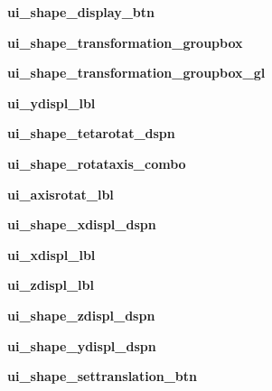 \begin{DoxyCompactItemize}
\item 
\hypertarget{a00099_ae8028f5880df8b13414eba6f474a3aee}{}\label{a00099_ae8028f5880df8b13414eba6f474a3aee} 
{\bfseries ui\+\_\+shape\+\_\+display\+\_\+btn}
\item 
\hypertarget{a00099_a1fc23acd26cd3067a21b1814e61be00e}{}\label{a00099_a1fc23acd26cd3067a21b1814e61be00e} 
{\bfseries ui\+\_\+shape\+\_\+transformation\+\_\+groupbox}
\item 
\hypertarget{a00099_aebd41dcf93d9fad7a4dca658b1889a44}{}\label{a00099_aebd41dcf93d9fad7a4dca658b1889a44} 
{\bfseries ui\+\_\+shape\+\_\+transformation\+\_\+groupbox\+\_\+gl}
\item 
\hypertarget{a00099_a692312c2b09073353e2bfb7432092583}{}\label{a00099_a692312c2b09073353e2bfb7432092583} 
{\bfseries ui\+\_\+ydispl\+\_\+lbl}
\item 
\hypertarget{a00099_aa28c70006d121bac80ae12022d751fd9}{}\label{a00099_aa28c70006d121bac80ae12022d751fd9} 
{\bfseries ui\+\_\+shape\+\_\+tetarotat\+\_\+dspn}
\item 
\hypertarget{a00099_ab8782732fd9dcbabe62718d4fd1eb451}{}\label{a00099_ab8782732fd9dcbabe62718d4fd1eb451} 
{\bfseries ui\+\_\+shape\+\_\+rotataxis\+\_\+combo}
\item 
\hypertarget{a00099_a9f2714b1287e94beaec813c4859a76ed}{}\label{a00099_a9f2714b1287e94beaec813c4859a76ed} 
{\bfseries ui\+\_\+axisrotat\+\_\+lbl}
\item 
\hypertarget{a00099_a9a614d93a0e921aa5e8e2692269ea93e}{}\label{a00099_a9a614d93a0e921aa5e8e2692269ea93e} 
{\bfseries ui\+\_\+shape\+\_\+xdispl\+\_\+dspn}
\item 
\hypertarget{a00099_a365b7f614170273dffc60d90f68e7b50}{}\label{a00099_a365b7f614170273dffc60d90f68e7b50} 
{\bfseries ui\+\_\+xdispl\+\_\+lbl}
\item 
\hypertarget{a00099_a6393abac6ef3d14dd99f90c2038ce668}{}\label{a00099_a6393abac6ef3d14dd99f90c2038ce668} 
{\bfseries ui\+\_\+zdispl\+\_\+lbl}
\item 
\hypertarget{a00099_ac2513163c4489ee11aa128f248ac25bc}{}\label{a00099_ac2513163c4489ee11aa128f248ac25bc} 
{\bfseries ui\+\_\+shape\+\_\+zdispl\+\_\+dspn}
\item 
\hypertarget{a00099_a6d782a6f55b193b51dbc457441b6bb6b}{}\label{a00099_a6d782a6f55b193b51dbc457441b6bb6b} 
{\bfseries ui\+\_\+shape\+\_\+ydispl\+\_\+dspn}
\item 
\hypertarget{a00099_a7463f5748bcd87fed9c7aa83d70d7b4c}{}\label{a00099_a7463f5748bcd87fed9c7aa83d70d7b4c} 
{\bfseries ui\+\_\+shape\+\_\+settranslation\+\_\+btn}

\end{DoxyCompactItemize}
